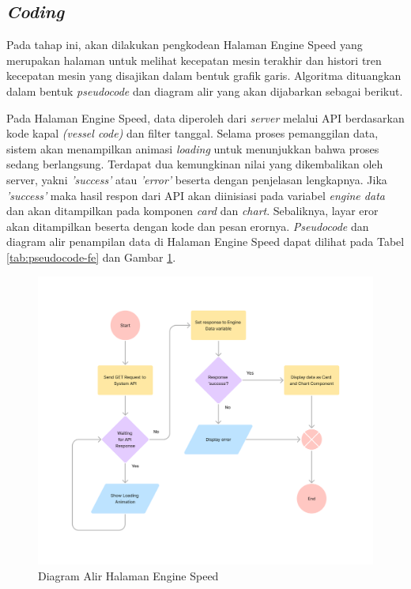 \subsection{\textit{Coding}}

Pada tahap ini, akan dilakukan pengkodean Halaman Engine Speed yang merupakan halaman untuk melihat kecepatan mesin terakhir dan histori tren kecepatan mesin yang disajikan dalam bentuk grafik garis. Algoritma dituangkan dalam bentuk \textit{pseudocode} dan diagram alir yang akan dijabarkan sebagai berikut.

Pada Halaman Engine Speed, data diperoleh dari \textit{server} melalui API berdasarkan kode kapal \textit{(vessel code)} dan filter tanggal. Selama proses pemanggilan data, sistem akan menampilkan animasi \textit{loading} untuk menunjukkan bahwa proses sedang berlangsung. Terdapat dua kemungkinan nilai yang dikembalikan oleh server, yakni \textit{'success'} atau \textit{'error'} beserta dengan penjelasan lengkapnya. Jika \textit{'success'} maka hasil respon dari API akan diinisiasi pada variabel \textit{engine data} dan akan ditampilkan pada komponen \textit{card} dan \textit{chart}. Sebaliknya, layar eror akan ditampilkan beserta dengan kode dan pesan erornya. \textit{Pseudocode} dan diagram alir penampilan data di Halaman Engine Speed dapat dilihat pada Tabel \ref{tab:pseudocode-fe} dan Gambar \ref{fig:flow-fe}.



\begin{figure}[!h]
    \includegraphics[width=1.2\linewidth, center]{images/flowcharts/flow-fe.png}
    \caption{Diagram Alir Halaman Engine Speed}
    \label{fig:flow-fe}
\end{figure}

